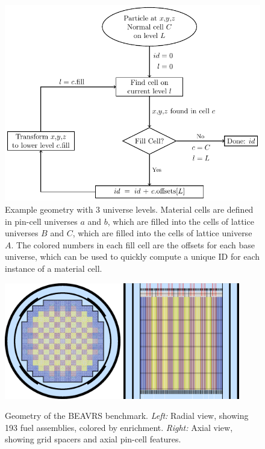 \begin{figure}
    \centering
    \includegraphics[width=6in]{figures/workflow/openmc/flow.pdf}
    \caption{\label{fig:indexing_scheme} Example geometry with 3 universe levels.  Material cells are defined in pin-cell universes $a$ and $b$, which are filled into the cells of lattice universes $B$ and $C$, which are filled into the cells of lattice universe $A$.  The colored numbers in each fill cell are the offsets for each base universe, which can be used to quickly compute a unique ID for each instance of a material cell.}
\end{figure}

\begin{figure}[htb!]
    \centering
    \includegraphics[width=2in]{figures/workflow/openmc/core}\hspace{1cm}
    \includegraphics[width=2in]{figures/workflow/openmc/core_axial}
    \caption{\label{fig:beavrs} Geometry of the BEAVRS benchmark. \emph{Left:} Radial view, showing 193 fuel assemblies, colored by enrichment. \emph{Right:} Axial view, showing grid spacers and axial pin-cell features.}
\end{figure}

